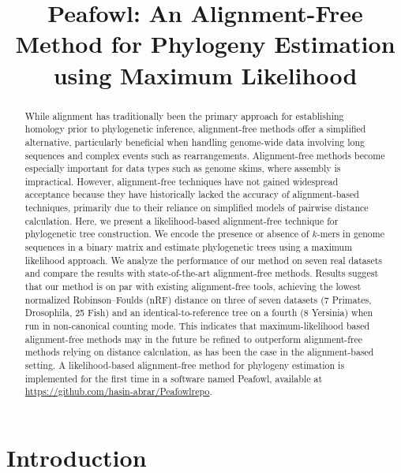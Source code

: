 \documentclass[11pt]{article}
\title{Peafowl: An Alignment-Free Method for Phylogeny Estimation using Maximum Likelihood}
\author{}
\date{}
\begin{document}
\maketitle

\begin{abstract}
\noindent
While alignment has traditionally been the primary approach for establishing homology prior to phylogenetic inference, alignment-free methods offer a simplified alternative, particularly beneficial when handling genome-wide data involving long sequences and complex events such as rearrangements. Alignment-free methods become especially important for data types such as genome skims, where assembly is impractical. However, alignment-free techniques have not gained widespread acceptance because they have historically lacked the accuracy of alignment-based techniques, primarily due to their reliance on simplified models of pairwise distance calculation. Here, we present a likelihood-based alignment-free technique for phylogenetic tree construction. We encode the presence or absence of $k$-mers in genome sequences in a binary matrix and estimate phylogenetic trees using a maximum likelihood approach. We analyze the performance of our method on seven real datasets and compare the results with state-of-the-art alignment-free methods. Results suggest that our method is on par with existing alignment-free tools, achieving the lowest normalized Robinson--Foulds (nRF) distance on three of seven datasets (7 Primates, Drosophila, 25 Fish) and an identical-to-reference tree on a fourth (8 Yersinia) when run in non-canonical counting mode. This indicates that maximum-likelihood based alignment-free methods may in the future be refined to outperform alignment-free methods relying on distance calculation, as has been the case in the alignment-based setting. A likelihood-based alignment-free method for phylogeny estimation is implemented for the first time in a software named Peafowl, available at \url{https://github.com/hasin-abrar/Peafowlrepo}.
\end{abstract}

\section{Introduction}
\end{document}
